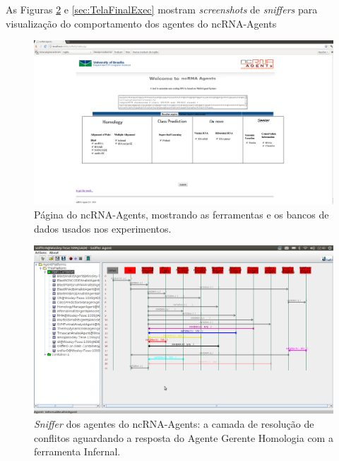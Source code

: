 As Figuras \ref{sec:TelaRespostaInfernal} e \ref{sec:TelaFinalExec} mostram \textit{screenshots} de \textit{sniffers} para visualização do comportamento dos agentes do ncRNA-Agents

\begin{landscape}
\begin{figure}[htb!] 
\centering
\includegraphics[angle=0,width=1.5\textwidth]{imagens//Interface.png}
\caption{Página do ncRNA-Agents, mostrando as ferramentas e os bancos de dados usados nos experimentos.} \label{sec:Interface}
\end{figure}
\end{landscape}

\begin{landscape}
\begin{figure}[htb!]
\centering
\includegraphics[angle=0,width=1.5\textwidth]{imagens//RespostaInferanal.png}
\caption{\textit{Sniffer} dos agentes do ncRNA-Agents: a camada de resolução de conflitos aguardando a resposta do Agente Gerente Homologia com a ferramenta Infernal.\label{sec:TelaRespostaInfernal}}
\end{figure}
\end{landscape}

